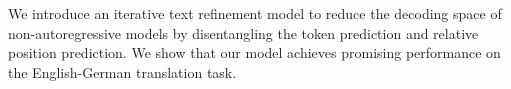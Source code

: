We introduce an iterative text refinement model to reduce the decoding space of non-autoregressive models by disentangling the token prediction and relative position prediction. We show that our model achieves promising performance on the English-German translation task.
